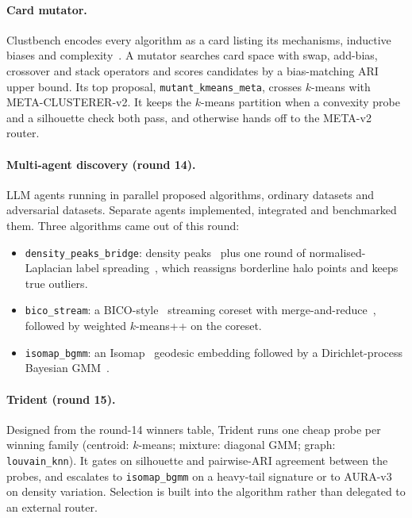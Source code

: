 \documentclass[11pt,a4paper]{article}
\newcommand{\code}[1]{\texttt{#1}}
\begin{document}
\paragraph{Card mutator.} Clustbench encodes every algorithm as a card listing
its mechanisms, inductive biases and complexity~\cite{clustbenchharness}. A
mutator searches card space with swap, add-bias, crossover and stack
operators and scores candidates by a bias-matching ARI upper bound. Its top
proposal, \code{mutant\_kmeans\_meta}, crosses $k$-means with
META-CLUSTERER-v2. It keeps the $k$-means partition when a convexity probe and
a silhouette check both pass, and otherwise hands off to the META-v2 router.

\paragraph{Multi-agent discovery (round 14).} LLM agents running in parallel
proposed algorithms, ordinary datasets and adversarial datasets. Separate
agents implemented, integrated and benchmarked them. Three algorithms came out
of this round:
\begin{itemize}
  \item \code{density\_peaks\_bridge}: density peaks~\cite{rodriguez2014clustering}
  plus one round of normalised-Laplacian label
  spreading~\cite{zhou2004learning}, which reassigns borderline halo points and
  keeps true outliers.
  \item \code{bico\_stream}: a BICO-style~\cite{fichtenberger2013bico} streaming
  coreset with merge-and-reduce~\cite{harpeled2004coresets}, followed by
  weighted $k$-means++ on the coreset.
  \item \code{isomap\_bgmm}: an Isomap~\cite{tenenbaum2000global} geodesic
  embedding followed by a Dirichlet-process Bayesian GMM~\cite{blei2006variational}.
\end{itemize}

\paragraph{Trident (round 15).} Designed from the round-14 winners table,
Trident runs one cheap probe per winning family (centroid: $k$-means;
mixture: diagonal GMM; graph: \code{louvain\_knn}). It gates on silhouette and
pairwise-ARI agreement between the probes, and escalates to \code{isomap\_bgmm}
on a heavy-tail signature or to AURA-v3 on density variation. Selection is
built into the algorithm rather than delegated to an external router.
\end{document}
